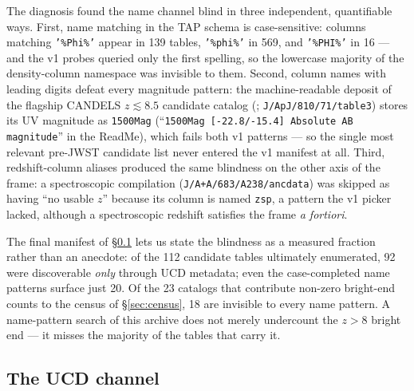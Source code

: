 \documentclass[twocolumn]{aastex702}
\begin{document}
The diagnosis found the name channel blind in three independent, quantifiable ways.
First, name matching in the TAP schema is case-sensitive: columns matching
\texttt{'\%Phi\%'} appear in 139 tables, \texttt{'\%phi\%'} in 569, and
\texttt{'\%PHI\%'} in 16 --- and the v1 probes queried only the first spelling, so the
lowercase majority of the density-column namespace was invisible to them. Second,
column names with leading digits defeat every magnitude pattern: the machine-readable
deposit of the flagship CANDELS $z\lesssim8.5$ candidate catalog
(\citealt{finkelstein15}; \texttt{J/ApJ/810/71/table3}) stores its UV magnitude as
\texttt{1500Mag} (``\texttt{1500Mag [-22.8/-15.4] Absolute AB magnitude}'' in the
ReadMe), which fails both v1 patterns --- so the single most relevant pre-JWST candidate
list never entered the v1 manifest at all. Third, redshift-column aliases produced the
same blindness on the other axis of the frame: a spectroscopic compilation
(\texttt{J/A+A/683/A238/ancdata}) was skipped as having ``no usable $z$'' because its
column is named \texttt{zsp}, a pattern the v1 picker lacked, although a spectroscopic
redshift satisfies the frame \emph{a fortiori}.

The final manifest of \S\ref{sec:ucdchannel} lets us state the blindness as a measured
fraction rather than an anecdote: of the 112 candidate tables ultimately enumerated, 92
were discoverable \emph{only} through UCD metadata; even the case-completed name
patterns surface just 20. Of the 23 catalogs that contribute non-zero bright-end counts
to the census of \S\ref{sec:census}, 18 are invisible to every name pattern. A
name-pattern search of this archive does not merely undercount the $z>8$ bright end ---
it misses the majority of the tables that carry it.

\subsection{The UCD channel} \label{sec:ucdchannel}
\end{document}
